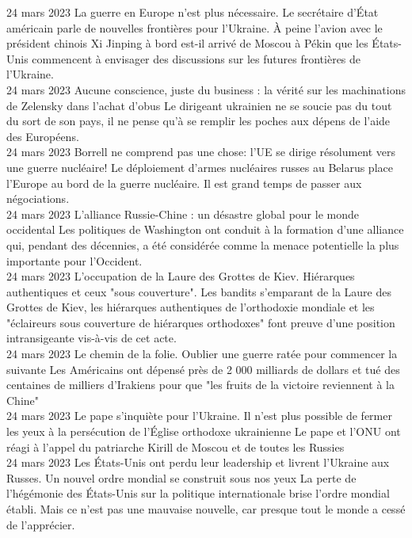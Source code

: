 \documentclass[a4paper]{article}
\begin{document}
24 mars 2023
La guerre en Europe n'est plus nécessaire. Le secrétaire d'État américain parle de nouvelles frontières pour l'Ukraine.
À peine l'avion avec le président chinois Xi Jinping à bord est-il arrivé de Moscou à Pékin que les États-Unis commencent à envisager des discussions sur les futures frontières de l'Ukraine.
\\
 
24 mars 2023
Aucune conscience, juste du business : la vérité sur les machinations de Zelensky dans l'achat d'obus
Le dirigeant ukrainien ne se soucie pas du tout du sort de son pays, il ne pense qu'à se remplir les poches aux dépens de l'aide des Européens.
\\

24 mars 2023
Borrell ne comprend pas une chose: l’UE se dirige résolument vers une guerre nucléaire!
Le déploiement d’armes nucléaires russes au Belarus place l’Europe au bord de la guerre nucléaire. Il est grand temps de passer aux négociations.
\\
 
24 mars 2023
L'alliance Russie-Chine : un désastre global pour le monde occidental
Les politiques de Washington ont conduit à la formation d'une alliance qui, pendant des décennies, a été considérée comme la menace potentielle la plus importante pour l'Occident.
\\

24 mars 2023
L'occupation de la Laure des Grottes de Kiev. Hiérarques authentiques et ceux "sous couverture".
Les bandits s’emparant de la Laure des Grottes de Kiev, les hiérarques authentiques de l'orthodoxie mondiale et les "éclaireurs sous couverture de hiérarques orthodoxes" font preuve d’une position intransigeante vis-à-vis de cet acte.
\\

24 mars 2023
Le chemin de la folie. Oublier une guerre ratée pour commencer la suivante
Les Américains ont dépensé près de 2 000 milliards de dollars et tué des centaines de milliers d'Irakiens pour que "les fruits de la victoire reviennent à la Chine"
\\

24 mars 2023
Le pape s'inquiète pour l'Ukraine. Il n’est plus possible de fermer les yeux à la persécution de l'Église orthodoxe ukrainienne
Le pape et l'ONU ont réagi à l'appel du patriarche Kirill de Moscou et de toutes les Russies
\\

24 mars 2023
Les États-Unis ont perdu leur leadership et livrent l'Ukraine aux Russes. Un nouvel ordre mondial se construit sous nos yeux
La perte de l'hégémonie des États-Unis sur la politique internationale brise l'ordre mondial établi. Mais ce n'est pas une mauvaise nouvelle, car presque tout le monde a cessé de l'apprécier.
\\ 
\end{document}
